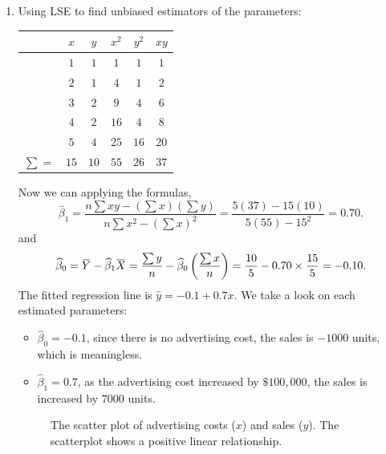 \begin{solution}
    \begin{enumerate}
        \item Using LSE to find unbiased estimators of the parameters:

    \begin{center}
        \begin{tabular}{c|c|c|c|c|c}
        & $x$ & $y$ & $x^2$ & $y^2$ & $xy$\\
        \hline
        & $1$ & $1$ & $1$ & $1$ & $1$\\
        & $2$ & $1$ & $4$ & $1$ & $2$\\
        & $3$ & $2$ & $9$ & $4$ & $6$\\
        & $4$ & $2$ & $16$ & $4$ & $8$\\
        & $5$ & $4$ & $25$ & $16$ & $20$\\
        \hline
        $\sum=$ & $15$ & $10$ & $55$ & $26$ & $37$\\
        \hline
        \end{tabular}
    \end{center}
    Now we can applying the formulas,
    \[
        \widehat{\beta}_1 = \frac{n\sum xy - (\sum x)(\sum y)}{n\sum x^2 - (\sum x)^2}
        = \frac{5(37) - 15(10)}{5(55)-15^2} = 0.70.
    \]
    and 
    \[
        \widehat{\beta}_0 = \ols{Y} - \widehat{\beta}_1 \ols{X} = 
        \frac{\sum y}{n} - \widehat{\beta}_0 \left(\frac{\sum x}{n} \right)
        = \frac{10}{5} - 0.70 \times \frac{15}{5} 
        = -0.10.
    \]
    The fitted regression line is $\widehat{y} = -0.1 + 0.7x$. We take a look on each estimated parameters:
    \begin{itemize}
        \item[$\bullet$] $\widehat{\beta}_0 = -0.1$, since there is no advertising cost, the sales is $-1000$ units, which is meaningless.
        \item[$\bullet$] $\widehat{\beta}_1 = 0.7$, as the advertising cost increased by $\$100,000$, the sales is increased by $7000$ units.
    \end{itemize}

    \begin{figure}[ht]
    \centering
        \caption{The scatter plot of advertising costs ($x$) and sales ($y$). The scatterplot shows a positive linear relationship.}
    \end{figure}


\end{enumerate}
\end{solution}
